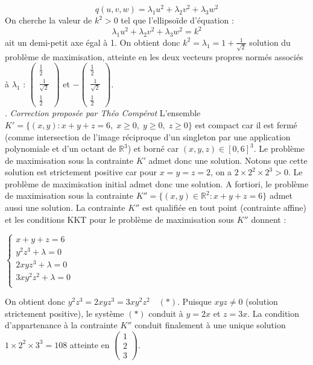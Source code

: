 \documentclass{report}
\begin{document}
$$ q(u,v,w) = \lambda_1 u^2 + \lambda_2 v^2 + \lambda_3 w ^2 $$
On cherche la valeur de $k^2>0$ tel que l'ellipsoïde d'équation :
$$\lambda_1 u^2 + \lambda_2 v^2 + \lambda_3 w ^2 = k^2 $$
ait un demi-petit axe égal à 1. On obtient donc $k^2= \lambda_1 = 1 + \frac{1}{\sqrt{2}}$ solution du problème de maximisation, atteinte en les deux vecteurs propres normés associés à $\lambda_1$ : $\begin{pmatrix} \frac{1}{2} \\ \frac{1}{\sqrt{2}} \\ \frac{1}{2} \end{pmatrix}$ et $-\begin{pmatrix} \frac{1}{2} \\ \frac{1}{\sqrt{2}} \\ \frac{1}{2} \end{pmatrix}$. \\

. \hfill \textit{Correction proposée par Théo Compérot}\newline
L'ensemble $K' = \{(x,y) : x+y+z = 6,\; x\geqslant 0,\; y\geqslant 0,\; z\geqslant 0\}$ est compact car il est fermé (comme intersection de l'image réciproque d'un singleton par une application polynomiale et d'un octant de $\mathbb R^3$) et borné car $(x,y,z) \in [0,6]^3$. Le problème de maximisation sous la contrainte $K'$ admet donc une solution. Notons que cette solution est strictement positive car pour $x=y=z=2$, on a $2\times 2^2 \times 2^3 >0$. Le problème de maximisation initial admet donc une solution. A fortiori, le problème de maximisation sous la contrainte $K'' = \{(x,y) \in \mathbb R^2 : x+y+z = 6 \}$ admet aussi une solution. La contrainte $K''$ est qualifiée en tout point (contrainte affine) et les conditions KKT pour le problème de maximisation sous $K''$ donnent :

$\begin{cases}
x+y+z = 6 \\
y^2z^3 + \lambda = 0 \\
2xyz^3 + \lambda = 0 \\
3xy^2z^2 + \lambda = 0 \\
\end{cases}$

On obtient donc $y^2z^3 = 2xyz^3 = 3xy^2z^2 \quad (\ast)$. Puisque $xyz \neq 0$ (solution strictement positive), le système $(\ast)$ conduit à $y=2x$ et $z = 3x$. La condition d'appartenance à la contrainte $K''$ conduit finalement à une unique solution $1\times 2^2 \times 3^3 = 108$ atteinte en $\begin{pmatrix} 1 \\ 2\\ 3 \end{pmatrix}$.
\end{document}
